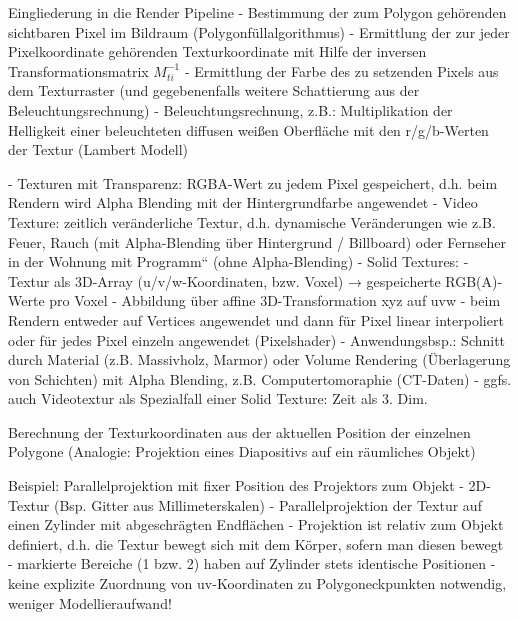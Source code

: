 \documentclass[10pt,landscape]{article}
\begin{document}
\begin{multicols}{3}
Eingliederung in die Render Pipeline
- Bestimmung der zum Polygon gehörenden sichtbaren Pixel im Bildraum (Polygonfüllalgorithmus)
- Ermittlung der zur jeder Pixelkoordinate gehörenden Texturkoordinate mit Hilfe der inversen Transformationsmatrix $M_{ti}^{−1}$
- Ermittlung der Farbe des zu setzenden Pixels aus dem Texturraster (und gegebenenfalls weitere Schattierung aus der Beleuchtungsrechnung)
- Beleuchtungsrechnung, z.B.: Multiplikation der Helligkeit einer beleuchteten diffusen weißen Oberfläche mit den r/g/b-Werten der Textur (Lambert Modell)


- Texturen mit Transparenz: RGBA-Wert zu jedem Pixel gespeichert, d.h. beim Rendern wird Alpha Blending mit der Hintergrundfarbe angewendet
- Video Texture: zeitlich veränderliche Textur, d.h. dynamische Veränderungen wie z.B. Feuer, Rauch (mit Alpha-Blending über Hintergrund / Billboard) oder Fernseher in der Wohnung mit Programm“ (ohne Alpha-Blending)
- Solid Textures:
  - Textur als 3D-Array (u/v/w-Koordinaten, bzw. Voxel) → gespeicherte RGB(A)-Werte pro Voxel
  - Abbildung über affine 3D-Transformation xyz auf uvw
  - beim Rendern entweder auf Vertices angewendet und dann für Pixel linear interpoliert oder für jedes Pixel einzeln angewendet (Pixelshader)
  - Anwendungsbsp.: Schnitt durch Material (z.B. Massivholz, Marmor) oder Volume Rendering (Überlagerung von Schichten) mit Alpha Blending, z.B. Computertomoraphie (CT-Daten)
  - ggfs. auch Videotextur als Spezialfall einer Solid Texture: Zeit als 3. Dim.

Berechnung der Texturkoordinaten aus der aktuellen Position der einzelnen Polygone (Analogie: Projektion eines Diapositivs auf ein räumliches Objekt)

Beispiel: Parallelprojektion mit fixer Position des Projektors zum Objekt
- 2D-Textur (Bsp. Gitter aus Millimeterskalen)
- Parallelprojektion der Textur auf einen Zylinder mit abgeschrägten Endflächen
- Projektion ist relativ zum Objekt definiert, d.h. die Textur bewegt sich mit dem Körper, sofern man diesen bewegt
- markierte Bereiche (1 bzw. 2) haben auf Zylinder stets identische Positionen
- keine explizite Zuordnung von uv-Koordinaten zu Polygoneckpunkten notwendig, weniger Modellieraufwand!


\end{multicols}
\end{document}
